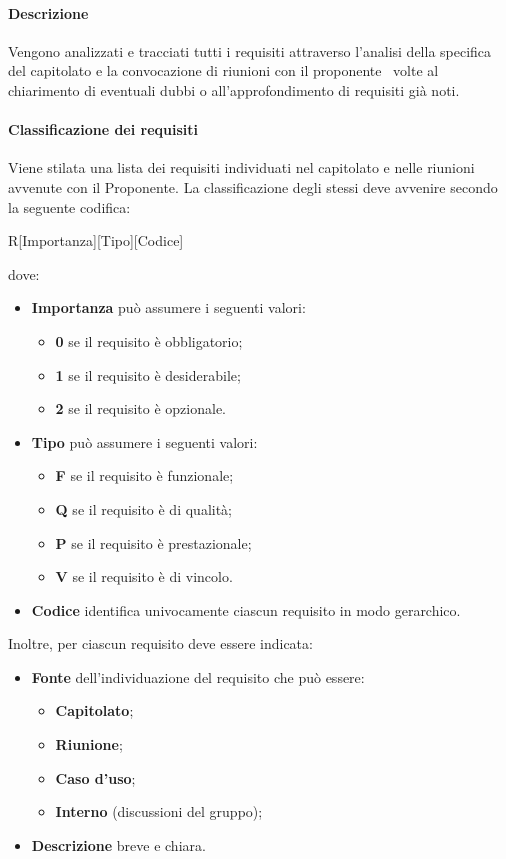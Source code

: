 \documentclass[../NormeDiProgetto.tex]{subfiles}
\begin{document}
			\paragraph{Descrizione\\}
				Vengono analizzati e tracciati tutti i requisiti attraverso l'analisi della
				specifica del capitolato e la convocazione di riunioni con il proponente
				\proponente\ volte al chiarimento di eventuali dubbi o all'approfondimento di
				requisiti già noti.
			\paragraph{Classificazione dei requisiti\\}
				Viene stilata una lista dei requisiti individuati nel capitolato e nelle
				riunioni avvenute con il Proponente. La classificazione
				degli stessi deve avvenire secondo la seguente codifica:
				\begin{center}
					R[Importanza][Tipo][Codice]
				\end{center}
				dove:
				\begin{itemize}
					\item \textbf{Importanza} può assumere i seguenti valori:
					\begin{itemize}
						\item \textbf{0} se il requisito è obbligatorio;
						\item \textbf{1} se il requisito è desiderabile;
						\item \textbf{2} se il requisito è opzionale.
					\end{itemize}
					\item \textbf{Tipo} può assumere i seguenti valori:
					\begin{itemize}
						\item \textbf{F} se il requisito è funzionale;
						\item \textbf{Q} se il requisito è di qualità;
						\item \textbf{P} se il requisito è prestazionale;
						\item \textbf{V} se il requisito è di vincolo.
					\end{itemize}
					\item \textbf{Codice} identifica univocamente
					ciascun requisito in modo gerarchico.
				\end{itemize}
				Inoltre, per ciascun requisito deve essere indicata:
				\begin{itemize}
					\item \textbf{Fonte} dell'individuazione del requisito che può essere:
					\begin{itemize}
						\item \textbf{Capitolato};
						\item \textbf{Riunione};
						\item \textbf{Caso d'uso};
						\item \textbf{Interno} (discussioni del gruppo);
					\end{itemize}
					\item \textbf{Descrizione} breve e chiara.
				\end{itemize}
\end{document}
